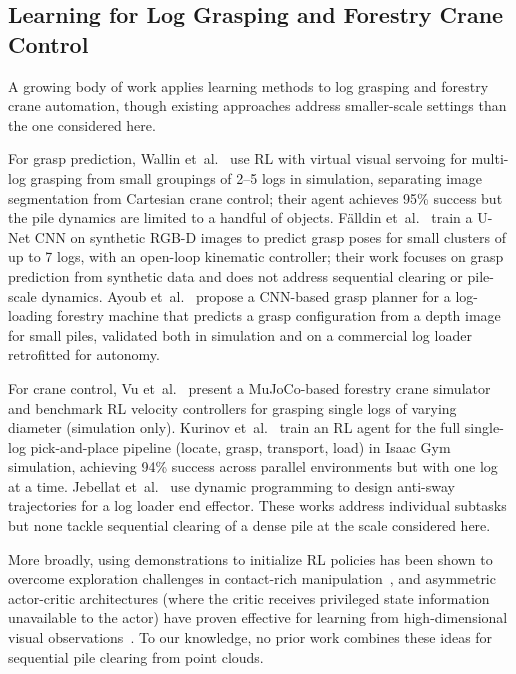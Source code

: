 \documentclass[conference]{IEEEtran}
\begin{document}
\subsection{Learning for Log Grasping and Forestry Crane Control}
A growing body of work applies learning methods to log grasping and forestry crane automation, though existing approaches address smaller-scale settings than the one considered here.

For grasp prediction, Wallin et~al.~\cite{wallin2024multilog} use RL with virtual visual servoing for multi-log grasping from small groupings of 2--5 logs in simulation, separating image segmentation from Cartesian crane control; their agent achieves 95\% success but the pile dynamics are limited to a handful of objects.
F{\"a}lldin et~al.~\cite{falldin2025synthesizing} train a U-Net CNN on synthetic RGB-D images to predict grasp poses for small clusters of up to 7 logs, with an open-loop kinematic controller; their work focuses on grasp prediction from synthetic data and does not address sequential clearing or pile-scale dynamics.
Ayoub et~al.~\cite{ayoub2023grasp} propose a CNN-based grasp planner for a log-loading forestry machine that predicts a grasp configuration from a depth image for small piles, validated both in simulation and on a commercial log loader retrofitted for autonomy.

For crane control, Vu et~al.~\cite{vu2025autonomous} present a MuJoCo-based forestry crane simulator and benchmark RL velocity controllers for grasping single logs of varying diameter (simulation only).
Kurinov et~al.~\cite{kurinov2025reinforcement} train an RL agent for the full single-log pick-and-place pipeline (locate, grasp, transport, load) in Isaac Gym simulation, achieving 94\% success across parallel environments but with one log at a time.
Jebellat et~al.~\cite{jebellat2025designing} use dynamic programming to design anti-sway trajectories for a log loader end effector.
These works address individual subtasks but none tackle sequential clearing of a dense pile at the scale considered here.

More broadly, using demonstrations to initialize RL policies has been shown to overcome exploration challenges in contact-rich manipulation~\cite{rajeswaran2018learning, nair2018overcoming}, and asymmetric actor-critic architectures (where the critic receives privileged state information unavailable to the actor) have proven effective for learning from high-dimensional visual observations~\cite{pinto2018asymmetric}.
To our knowledge, no prior work combines these ideas for sequential pile clearing from point clouds.
\end{document}
